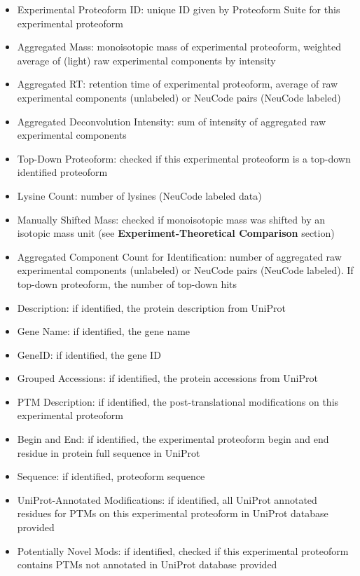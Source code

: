 \begin{itemize}
\begin{figure}[h]
\end{figure}
	\begin{itemize}
		\item Experimental Proteoform ID: unique ID given by Proteoform Suite for this experimental proteoform
		\item Aggregated Mass: monoisotopic mass of experimental proteoform, weighted average of (light) raw experimental components by intensity
		\item Aggregated RT: retention time of experimental proteoform, average of raw experimental components (unlabeled) or NeuCode pairs (NeuCode labeled)
		\item Aggregated Deconvolution Intensity: sum of intensity of aggregated raw experimental components
		\item Top-Down Proteoform: checked if this experimental proteoform is a top-down identified proteoform
		\item Lysine Count: number of lysines (NeuCode labeled data)
		\item Manually Shifted Mass: checked if monoisotopic mass was shifted by an isotopic mass unit (see \textbf{Experiment-Theoretical Comparison} section)
		\item Aggregated Component Count for Identification: number of aggregated raw experimental components (unlabeled) or NeuCode pairs (NeuCode labeled). If top-down proteoform, the number of top-down hits
		\item Description: if identified, the protein description from UniProt
		\item Gene Name: if identified, the gene name
		\item GeneID: if identified, the gene ID
		\item Grouped Accessions: if identified, the protein accessions from UniProt
		\item PTM Description: if identified, the post-translational modifications on this experimental proteoform
		\item Begin and End: if identified, the experimental proteoform begin and end residue in protein full sequence in UniProt
		\item Sequence: if identified, proteoform sequence
		\item UniProt-Annotated Modifications: if identified, all UniProt annotated residues for PTMs on this experimental  proteoform in UniProt database provided
		\item Potentially Novel Mods: if identified, checked if this experimental proteoform contains PTMs not annotated in UniProt database provided	

\end{itemize}
\end{itemize}
